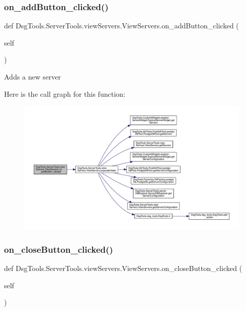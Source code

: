\subsubsection{\texorpdfstring{on\+\_\+add\+Button\+\_\+clicked()}{on\_addButton\_clicked()}}
{\footnotesize\ttfamily def Dsg\+Tools.\+Server\+Tools.\+view\+Servers.\+View\+Servers.\+on\+\_\+add\+Button\+\_\+clicked (\begin{DoxyParamCaption}\item[{}]{self }\end{DoxyParamCaption})}

\begin{DoxyVerb}Adds a new server
\end{DoxyVerb}
 Here is the call graph for this function\+:
\nopagebreak
\begin{figure}[H]
\begin{center}
\leavevmode
\includegraphics[width=350pt]{class_dsg_tools_1_1_server_tools_1_1view_servers_1_1_view_servers_a463ce1c1979b98080d1bcbcc1839b8d8_cgraph}
\end{center}
\end{figure}
\mbox{\label{class_dsg_tools_1_1_server_tools_1_1view_servers_1_1_view_servers_ad671560ae5d8ff0d9f4d5a916053f6a0}} 
\subsubsection{\texorpdfstring{on\+\_\+close\+Button\+\_\+clicked()}{on\_closeButton\_clicked()}}
{\footnotesize\ttfamily def Dsg\+Tools.\+Server\+Tools.\+view\+Servers.\+View\+Servers.\+on\+\_\+close\+Button\+\_\+clicked (\begin{DoxyParamCaption}\item[{}]{self }\end{DoxyParamCaption})}

